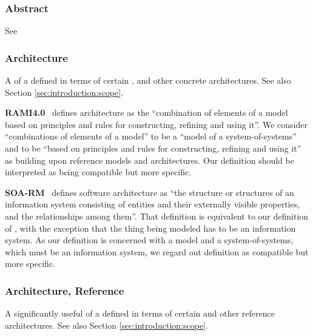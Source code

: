 %
%

{

\newcommand{\GlossaryEntry}[2]{\subsubsection*{#2}\label{sec:glossary:#1}}
\newcommand{\GlossaryNote}[2]{\begin{minipage}[b]{\dimexpr\linewidth-0.5cm\relax}\vspace*{0.33cm}\footnotesize{\textbf{#1}\ #2}\end{minipage}}

\GlossaryEntry{abstract}{Abstract}
See 

\GlossaryEntry{architecture}{Architecture}
A  of a  defined in terms of certain ,  and other concrete architectures.
See also Section \ref{sec:introduction:scope}.

	\GlossaryNote{RAMI4.0}{
	    defines architecture as the ``combination of elements of a model based on principles and rules for constructing, refining and using it''.
		We consider ``combinations of elements of a model'' to be a ``model of a system-of-systems'' and to be ``based on principles and rules for constructing, refining and using it'' as building upon reference models and architectures.
		Our definition should be interpreted as being compatible but more specific.
	}

	\GlossaryNote{SOA-RM}{
		defines software architecture as ``the structure or structures of an information system consisting of entities and their externally visible properties, and the relationships among them''.
		That definition is equivalent to our definition of \GlossaryHyperRef{model}{model}, with the exception that the thing being modeled has to be an information system.
		As our definition is concerned with a model and a system-of-systems, which must be an information system, we regard out definition as compatible but more specific.
	}

\GlossaryEntry{architecture-reference}{Architecture, Reference}
A significantly useful  of a  defined in terms of certain  and other reference architectures.
See also Section \ref{sec:introduction:scope}.

}
